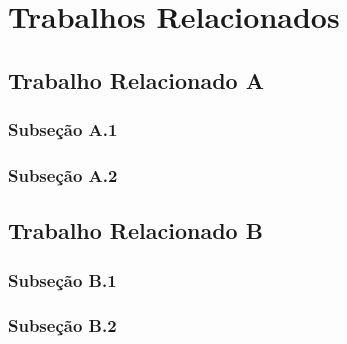 \chapter{Trabalhos Relacionados}
\label{ch:trabalhos-relacionados}

\section{T\lowercase{rabalho} R\lowercase{elacionado} A}
\label{sec:trabalhos-relacionado-a}

\subsection{Subseção A.1}
\label{subsec:subsecao-a.13}

\subsection{Subseção A.2}
\label{subsec:subsecao-a.23}

\section{T\lowercase{rabalho} R\lowercase{elacionado} B}
\label{sec:trabalhos-relacionado-b}

\subsection{Subseção B.1}
\label{subsec:subsecao-b.13}

\subsection{Subseção B.2}
\label{subsec:subsecao-b.23}